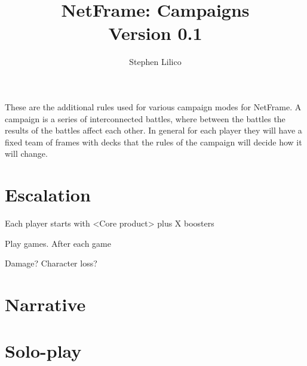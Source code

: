 \documentclass[a4paper, twocolumn]{article}
\title{\Huge{\cardtitlefont NetFrame: Campaigns} \\ \small{Version 0.1}}
\author{Stephen Lilico}
\date{}
\begin{document}
\maketitle

These are the additional rules used for various campaign modes for NetFrame.
A campaign is a series of interconnected battles, where between the battles the results of the battles
affect each other. In general for each player they will have a fixed team of frames with decks that the rules
of the campaign will decide how it will change.

\tableofcontents
\clearpage

\section{Escalation}
Each player starts with <Core product> plus X boosters

Play games. After each game 

Damage? Character loss? 


\section{Narrative}

\section{Solo-play}
\end{document}
